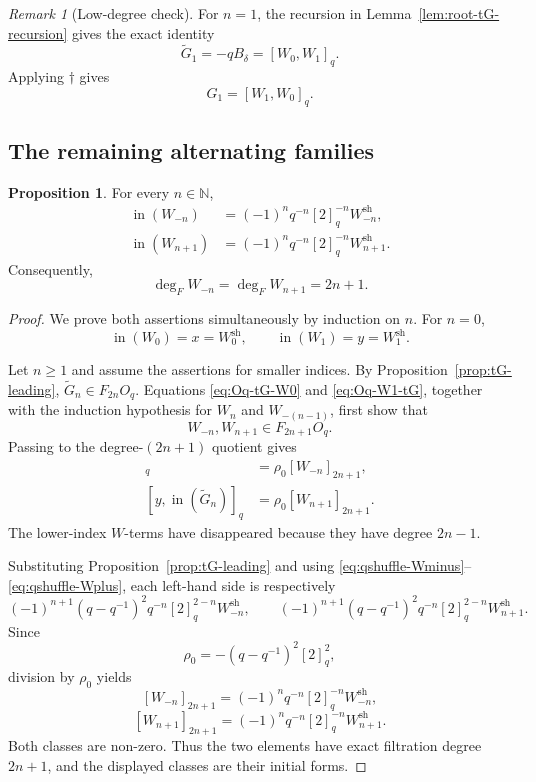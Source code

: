 \documentclass[11pt]{extarticle}
\theoremstyle{definition}
\newtheorem{proposition}[theorem]{Proposition}
\theoremstyle{remark}
\newtheorem{remark}[theorem]{Remark}
\numberwithin{equation}{section}
\newcommand{\N}{\mathbb N}
\newcommand{\Oq}{O_q}
\newcommand{\init}{\operatorname{in}}
\newcommand{\sh}{\mathrm{sh}}
\newcommand{\qcomm}[2]{[ #1,#2 ]_q}
\begin{document}
\begin{remark}[Low-degree check]
For $n=1$, the recursion in Lemma~\ref{lem:root-tG-recursion} gives the
exact identity
\begin{equation}
\label{eq:tG1-Bdelta}
        \widetilde G_1=-qB_\delta=[W_0,W_1]_q.
\end{equation}
Applying $\dagger$ gives
\begin{equation}
\label{eq:G1-low-check}
        G_1=[W_1,W_0]_q.
\end{equation}
\end{remark}

\subsection{The remaining alternating families}

\begin{proposition}
\label{prop:W-leading}
For every $n\in\N$,
\begin{align}
\init(W_{-n})
 &=(-1)^nq^{-n}[2]_q^{-n}W_{-n}^{\sh},
\label{eq:Wminus-leading}\\
\init(W_{n+1})
 &=(-1)^nq^{-n}[2]_q^{-n}W_{n+1}^{\sh}.
\label{eq:Wplus-leading}
\end{align}
Consequently,
\[
        \deg_F W_{-n}=\deg_F W_{n+1}=2n+1 .
\]
\end{proposition}

\begin{proof}
We prove both assertions simultaneously by induction on $n$.  For $n=0$,
\[
        \init(W_0)=x=W_0^{\sh},\qquad
        \init(W_1)=y=W_1^{\sh}.
\]

Let $n\geq1$ and assume the assertions for smaller indices.  By
Proposition~\ref{prop:tG-leading}, $\widetilde G_n\in F_{2n}\Oq$.
Equations \eqref{eq:Oq-tG-W0} and \eqref{eq:Oq-W1-tG}, together with the
induction hypothesis for $W_n$ and $W_{-(n-1)}$, first show that
\[
        W_{-n},W_{n+1}\in F_{2n+1}\Oq.
\]
Passing to the degree-$(2n+1)$ quotient gives
\begin{align}
\qcomm{\init(\widetilde G_n)}{x}
 &=\rho_0[W_{-n}]_{2n+1},
\label{eq:top-Wminus}\\
\qcomm{y}{\init(\widetilde G_n)}
 &=\rho_0[W_{n+1}]_{2n+1}.
\label{eq:top-Wplus}
\end{align}
The lower-index $W$-terms have disappeared because they have degree
$2n-1$.

Substituting Proposition~\ref{prop:tG-leading} and using
\eqref{eq:qshuffle-Wminus}--\eqref{eq:qshuffle-Wplus}, each left-hand side
is respectively
\[
 (-1)^{n+1}(q-q^{-1})^2q^{-n}[2]_q^{2-n}W_{-n}^{\sh},
 \qquad
 (-1)^{n+1}(q-q^{-1})^2q^{-n}[2]_q^{2-n}W_{n+1}^{\sh}.
\]
Since
\[
        \rho_0=-(q-q^{-1})^2[2]_q^2,
\]
division by $\rho_0$ yields
\[
 [W_{-n}]_{2n+1}=(-1)^nq^{-n}[2]_q^{-n}W_{-n}^{\sh},
\]
\[
 [W_{n+1}]_{2n+1}=(-1)^nq^{-n}[2]_q^{-n}W_{n+1}^{\sh}.
\]
Both classes are non-zero.  Thus the two elements have exact filtration
degree $2n+1$, and the displayed classes are their initial forms.
\end{proof}
\end{document}
